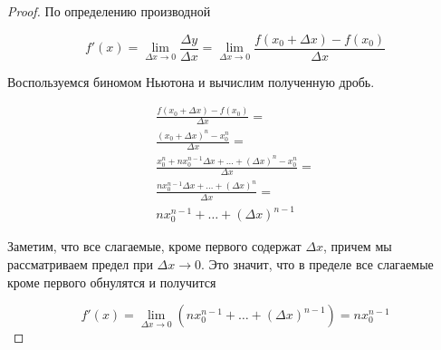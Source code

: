 \begin{proof}
  По определению производной
  
  \begin{equation*}
    f'(x)
    = \lim_{\Delta x \to 0} \frac{\Delta y}{\Delta x}
    = \lim_{\Delta x \to 0} \frac{f(x_0 + \Delta x) - f(x_0)}{\Delta x}    
  \end{equation*}

  Воспользуемся биномом Ньютона и вычислим полученную дробь.

  \begin{equation*}
    \begin{aligned}
      \frac{f(x_0 + \Delta x) - f(x_0)}{\Delta x}
    = \\
      \frac{(x_0 + \Delta x)^n - x_0^n}{\Delta x}
    = \\
      \frac{x_0^n + n x_0^{n - 1} \Delta x + \dotsc + (\Delta x)^n -
        x_0^n}{\Delta x}
    = \\
      \frac{n x_0^{n - 1} \Delta x + \dotsc + (\Delta x)^n}{\Delta x}
    = \\
      n x_0^{n - 1} + \dotsc + (\Delta x)^{n - 1}
    \end{aligned}
  \end{equation*}

  Заметим, что все слагаемые, кроме первого содержат \(\Delta x\), причем мы
  рассматриваем предел при \(\Delta x \to 0\). Это значит, что в пределе все
  слагаемые кроме первого обнулятся и получится

  \begin{equation*}
    f'(x)
    = \lim_{\Delta x \to 0} (n x_0^{n - 1} + \dotsc + (\Delta x)^{n - 1})
    = n x_0^{n - 1}
  \end{equation*}
\end{proof}
